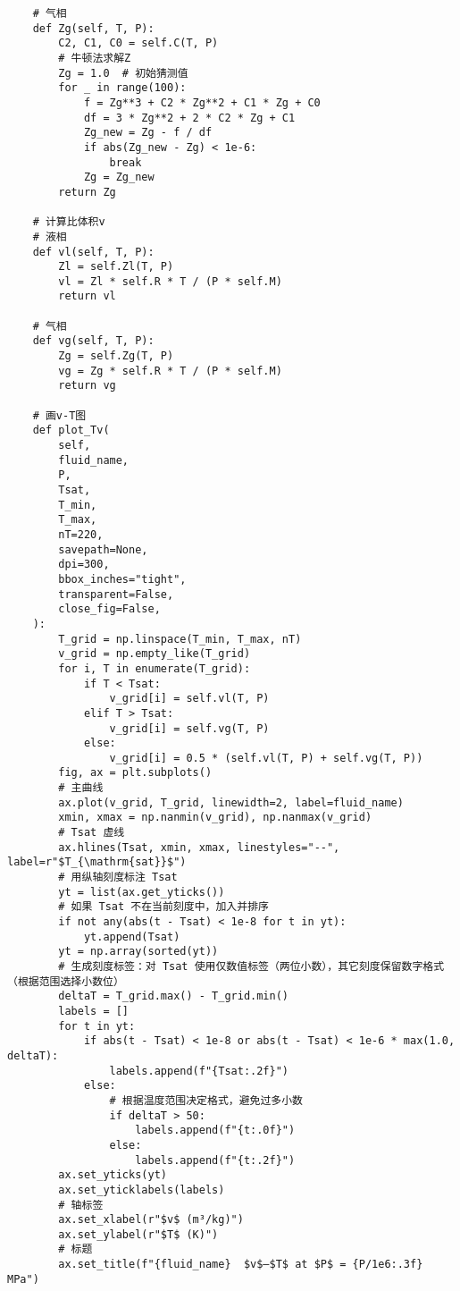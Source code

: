 \documentclass[12pt,a4paper]{article}
\begin{document}
\begin{lstlisting}
    # 气相
    def Zg(self, T, P):
        C2, C1, C0 = self.C(T, P)
        # 牛顿法求解Z
        Zg = 1.0  # 初始猜测值
        for _ in range(100):
            f = Zg**3 + C2 * Zg**2 + C1 * Zg + C0
            df = 3 * Zg**2 + 2 * C2 * Zg + C1
            Zg_new = Zg - f / df
            if abs(Zg_new - Zg) < 1e-6:
                break
            Zg = Zg_new
        return Zg

    # 计算比体积v
    # 液相
    def vl(self, T, P):
        Zl = self.Zl(T, P)
        vl = Zl * self.R * T / (P * self.M)
        return vl

    # 气相
    def vg(self, T, P):
        Zg = self.Zg(T, P)
        vg = Zg * self.R * T / (P * self.M)
        return vg

    # 画v-T图
    def plot_Tv(
        self,
        fluid_name,
        P,
        Tsat,
        T_min,
        T_max,
        nT=220,
        savepath=None,
        dpi=300,
        bbox_inches="tight",
        transparent=False,
        close_fig=False,
    ):
        T_grid = np.linspace(T_min, T_max, nT)
        v_grid = np.empty_like(T_grid)
        for i, T in enumerate(T_grid):
            if T < Tsat:
                v_grid[i] = self.vl(T, P)
            elif T > Tsat:
                v_grid[i] = self.vg(T, P)
            else:
                v_grid[i] = 0.5 * (self.vl(T, P) + self.vg(T, P))
        fig, ax = plt.subplots()
        # 主曲线
        ax.plot(v_grid, T_grid, linewidth=2, label=fluid_name)
        xmin, xmax = np.nanmin(v_grid), np.nanmax(v_grid)
        # Tsat 虚线
        ax.hlines(Tsat, xmin, xmax, linestyles="--", label=r"$T_{\mathrm{sat}}$")
        # 用纵轴刻度标注 Tsat
        yt = list(ax.get_yticks())
        # 如果 Tsat 不在当前刻度中，加入并排序
        if not any(abs(t - Tsat) < 1e-8 for t in yt):
            yt.append(Tsat)
        yt = np.array(sorted(yt))
        # 生成刻度标签：对 Tsat 使用仅数值标签（两位小数），其它刻度保留数字格式（根据范围选择小数位）
        deltaT = T_grid.max() - T_grid.min()
        labels = []
        for t in yt:
            if abs(t - Tsat) < 1e-8 or abs(t - Tsat) < 1e-6 * max(1.0, deltaT):
                labels.append(f"{Tsat:.2f}")
            else:
                # 根据温度范围决定格式，避免过多小数
                if deltaT > 50:
                    labels.append(f"{t:.0f}")
                else:
                    labels.append(f"{t:.2f}")
        ax.set_yticks(yt)
        ax.set_yticklabels(labels)
        # 轴标签
        ax.set_xlabel(r"$v$ (m³/kg)")
        ax.set_ylabel(r"$T$ (K)")
        # 标题
        ax.set_title(f"{fluid_name}  $v$–$T$ at $P$ = {P/1e6:.3f} MPa")

\end{lstlisting}
\end{document}
